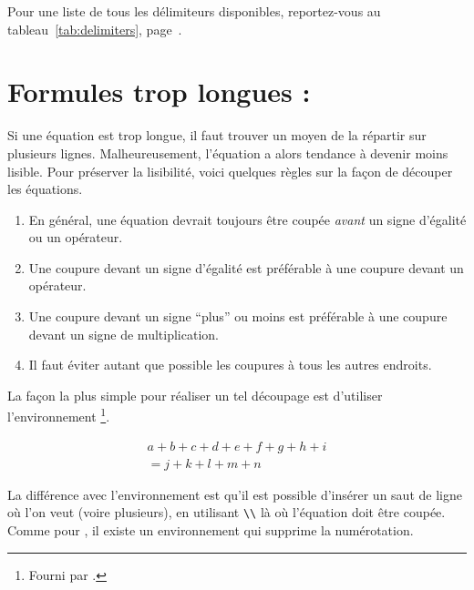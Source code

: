 Pour une liste de tous les délimiteurs disponibles, reportez-vous au
tableau~\ref{tab:delimiters}, page~\pageref{tab:delimiters}.


\section{Formules trop longues : }
\label{sec:multline}


Si une équation est trop longue, il faut trouver un moyen de la répartir sur
plusieurs lignes. Malheureusement, l'équation a alors tendance à devenir moins
lisible. Pour préserver la lisibilité, voici quelques règles sur la façon de
découper les équations.
\begin{enumerate}
  \item En général, une équation devrait toujours être coupée \emph{avant} un
    signe d'égalité ou un opérateur.
  \item Une coupure devant un signe d'égalité est préférable à une coupure
    devant un opérateur.
  \item Une coupure devant un signe \enquote{plus} ou moins est préférable à une
    coupure devant un signe de multiplication.
  \item Il faut éviter autant que possible les coupures à tous les autres
    endroits.
\end{enumerate}
La façon la plus simple pour réaliser un tel découpage est d'utiliser
l'environnement \footnote{Fourni par .}.
\begin{example}
\begin{multline}
  a + b + c + d + e + f
  + g + h + i
  \\
  = j + k + l + m + n
\end{multline}
\end{example}
\noindent
La différence avec l'environnement  est qu'il est possible
d'insérer un saut de ligne où l'on veut (voire plusieurs), en utilisant
\verb+\\+ là où l'équation doit être coupée. Comme pour , il
existe un environnement  qui supprime la numérotation.


